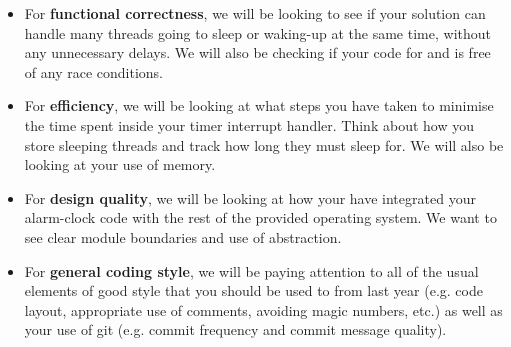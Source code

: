 \documentclass[a4paper,11pt]{article}
\begin{document}
\begin{itemize}
  \item For \textbf{functional correctness}, we will be looking to see if your solution can handle many threads going to sleep or waking-up at the same time, without any unnecessary delays. 
  We will also be checking if your code for  and  is free of any race conditions.
    
  \item For \textbf{efficiency}, we will be looking at what steps you have taken to minimise the time spent inside your timer interrupt handler. Think about how you store sleeping threads and track how long they must sleep for. We will also be looking at your use of memory.
    
  \item For \textbf{design quality}, we will be looking at how your have integrated your alarm-clock code with the rest of the provided operating system. We want to see clear module boundaries and use of abstraction.
 
  \item For \textbf{general coding style}, we will be paying attention to all of the usual elements of good style that you should be used to from last year (e.g. code layout, appropriate use of comments, avoiding magic numbers, etc.) as well as your use of git (e.g. commit frequency and commit message quality).
\end{itemize}











\end{document}
